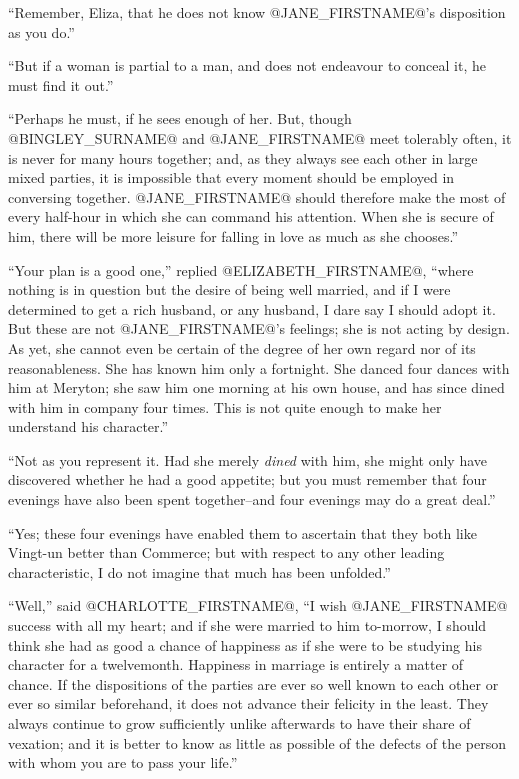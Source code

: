 ``Remember, Eliza, that he does not know @JANE_FIRSTNAME@'s disposition as you do.''

``But if a woman is partial to a man, and does not endeavour to conceal
it, he must find it out.''

``Perhaps he must, if he sees enough of her. But, though @BINGLEY_SURNAME@ and @JANE_FIRSTNAME@
meet tolerably often, it is never for many hours together; and, as they
always see each other in large mixed parties, it is impossible that
every moment should be employed in conversing together. @JANE_FIRSTNAME@ should
therefore make the most of every half-hour in which she can command his
attention. When she is secure of him, there will be more leisure for
falling in love as much as she chooses.''

``Your plan is a good one,'' replied @ELIZABETH_FIRSTNAME@, ``where nothing is in
question but the desire of being well married, and if I were determined
to get a rich husband, or any husband, I dare say I should adopt it. But
these are not @JANE_FIRSTNAME@'s feelings; she is not acting by design. As yet,
she cannot even be certain of the degree of her own regard nor of its
reasonableness. She has known him only a fortnight. She danced four
dances with him at Meryton; she saw him one morning at his own house,
and has since dined with him in company four times. This is not quite
enough to make her understand his character.''

``Not as you represent it. Had she merely \textit{dined} with him, she might
only have discovered whether he had a good appetite; but you must
remember that four evenings have also been spent together--and four
evenings may do a great deal.''

``Yes; these four evenings have enabled them to ascertain that they
both like Vingt-un better than Commerce; but with respect to any other
leading characteristic, I do not imagine that much has been unfolded.''

``Well,'' said @CHARLOTTE_FIRSTNAME@, ``I wish @JANE_FIRSTNAME@ success with all my heart; and
if she were married to him to-morrow, I should think she had as good a
chance of happiness as if she were to be studying his character for a
twelvemonth. Happiness in marriage is entirely a matter of chance. If
the dispositions of the parties are ever so well known to each other or
ever so similar beforehand, it does not advance their felicity in the
least. They always continue to grow sufficiently unlike afterwards to
have their share of vexation; and it is better to know as little as
possible of the defects of the person with whom you are to pass your
life.''

